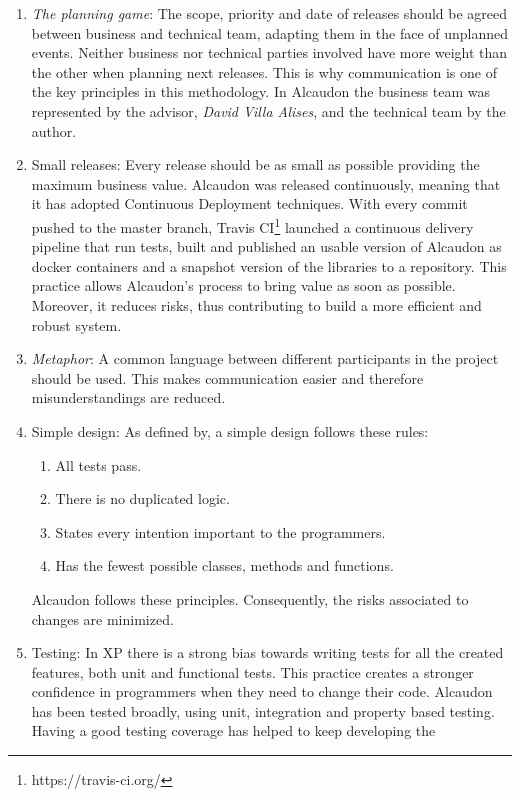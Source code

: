 \begin{enumerate}
\item \textit{The planning game}: The scope, priority and date of releases
  should be agreed between business and technical team, adapting them in the
  face of unplanned events. Neither business nor technical parties involved have
  more weight than the other when planning next releases. This is why
  communication is one of the key principles in this methodology. In Alcaudon
  the business team was represented by the advisor, \textit{David Villa Alises},
  and the technical team by the author.
\item Small releases: Every release should be as small as possible providing the
  maximum business value. Alcaudon was released continuously, meaning that it
  has adopted Continuous Deployment\cite{cd} techniques. With every commit
  pushed to the master branch, Travis CI\footnote{https://travis-ci.org/}
  launched a continuous delivery pipeline that run tests, built and published
  an usable version of Alcaudon as docker containers and a snapshot version of
  the libraries to a repository. This practice allows Alcaudon's process to
  bring value as soon as possible. Moreover, it reduces risks, thus contributing
  to build a more efficient and robust system.
\item \textit{Metaphor}: A common language between different participants in the
  project should be used. This makes communication easier and therefore
  misunderstandings are reduced.
\item Simple design: As defined by\cite{xp}, a simple design follows these rules:
  \begin{enumerate}
  \item All tests pass.
  \item There is no duplicated logic.
  \item States every intention important to the programmers.
  \item Has the fewest possible classes, methods and functions.
  \end{enumerate}
  Alcaudon follows these principles. Consequently, the risks associated to
  changes are minimized.
\item Testing: In \acs{XP} there is a strong bias towards writing tests for all the
  created features, both unit and functional tests. This practice creates
  a stronger confidence in programmers when they need to change their code.
  Alcaudon has been tested broadly, using unit, integration and property based
  testing. Having a good testing coverage has helped to keep developing the

\end{enumerate}
